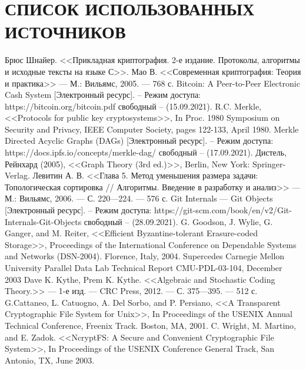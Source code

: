 \clearpage

\section*{СПИСОК ИСПОЛЬЗОВАННЫХ ИСТОЧНИКОВ}

\begingroup
\renewcommand{\section}[2]{}
\begin{thebibliography}{}
	Брюс Шнайер. <<Прикладная криптография. 2-е издание. Протоколы, алгоритмы и исходные тексты на языке С>>.
	Мао В. <<Современная криптография: Теория и практика>> — М.: Вильямс, 2005. — 768 с.
	Bitcoin: A Peer-to-Peer Electronic Cash System [Электронный ресурс]. – Режим доступа: 
	https://bitcoin.org/bitcoin.pdf
	свободный – (15.09.2021).
	R.C. Merkle, <<Protocols for public key cryptosystems>>, In Proc. 1980 Symposium on Security and Privacy, IEEE Computer Society, pages 122-133, April 1980.
	Merkle Directed Acyclic Graphs (DAGs) [Электронный ресурс]. – Режим доступа: 
	https://docs.ipfs.io/concepts/merkle-dag/
	свободный – (17.09.2021).
	Дистель, Рейнхард (2005), <<Graph Theory (3rd ed.)>>, Berlin, New York: Springer-Verlag.
	Левитин А. В. <<Глава 5. Метод уменьшения размера задачи: Топологическая сортировка // Алгоритмы. Введение в разработку и анализ>> — М.: Вильямс, 2006. — С. 220—224. — 576 с.
	Git Internals --- Git Objects [Электронный ресурс]. – Режим доступа: 
	https://git-scm.com/book/en/v2/Git-Internals-Git-Objects
	свободный – (28.09.2021).
	G. Goodson, J. Wylie, G. Ganger, and M. Reiter, <<Efficient Byzantine-tolerant Erasure-coded Storage>>, Proceedings of the International Conference on Dependable Systems and Networks (DSN-2004). Florence, Italy, 2004. Supercedes Carnegie Mellon University Parallel Data Lab Technical Report CMU-PDL-03-104, December 2003
	Dave K. Kythe, Prem K. Kythe. <<Algebraic and Stochastic Coding Theory.>> — 1-е изд. — CRC Press, 2012. — С. 375—395. — 512 с.
	G.Cattaneo, L. Catuogno, A. Del Sorbo, and P. Persiano, <<A Transparent Cryptographic File System for Unix>>, In Proceedings of the USENIX Annual Technical Conference, Freenix Track. Boston, MA, 2001.
	C. Wright, M. Martino, and E. Zadok. <<NcryptFS: A Secure and Convenient Cryptographic File System>>, In Proceedings of the USENIX Conference General Track, San Antonio, TX, June 2003.

\end{thebibliography}
